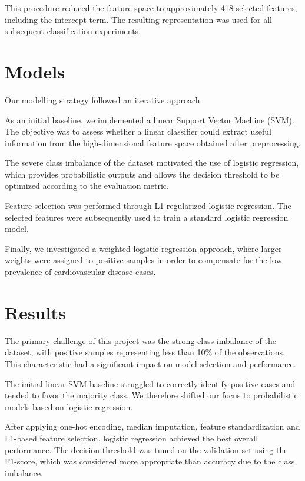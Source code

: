 \documentclass[10pt,a4paper,twocolumn]{article}
\begin{document}
This procedure reduced the feature space to approximately 418 selected features, including the intercept term.
The resulting representation was used for all subsequent classification experiments.

\section{Models}

Our modelling strategy followed an iterative approach.

As an initial baseline, we implemented a linear Support Vector Machine (SVM).
The objective was to assess whether a linear classifier could extract useful information from the high-dimensional feature space obtained after preprocessing.

The severe class imbalance of the dataset motivated the use of logistic regression, which provides probabilistic outputs and allows the decision threshold to be optimized according to the evaluation metric.

Feature selection was performed through L1-regularized logistic regression.
The selected features were subsequently used to train a standard logistic regression model.

Finally, we investigated a weighted logistic regression approach, where larger weights were assigned to positive samples in order to compensate for the low prevalence of cardiovascular disease cases.

\section{Results}

The primary challenge of this project was the strong class imbalance of the dataset, with positive samples representing less than 10\% of the observations.
This characteristic had a significant impact on model selection and performance.

The initial linear SVM baseline struggled to correctly identify positive cases and tended to favor the majority class. We therefore shifted our focus to probabilistic models based on logistic regression.

After applying one-hot encoding, median imputation, feature standardization and L1-based feature selection, logistic regression achieved the best overall performance.
The decision threshold was tuned on the validation set using the F1-score, which was considered more appropriate than accuracy due to the class imbalance.
\end{document}
